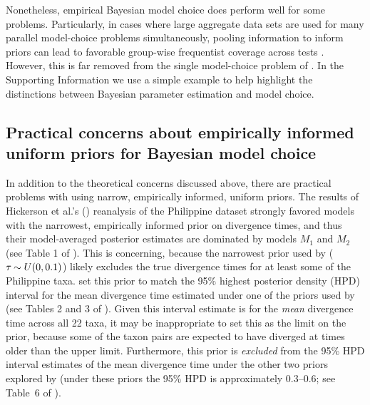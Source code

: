Nonetheless, empirical Bayesian model choice does perform well for some
problems.
Particularly, in cases where large aggregate data sets are used for many
parallel model-choice problems simultaneously, pooling information to inform
priors can lead to favorable group-wise frequentist coverage across tests
\citep{Efron2008}.
However, this is far removed from the single model-choice problem of \msb.
In the Supporting Information we use a simple example to help highlight the
distinctions between Bayesian parameter estimation and model choice.

\subsection{Practical concerns about empirically informed uniform priors for
    Bayesian model choice}
In addition to the theoretical concerns discussed above, there are practical
problems with using narrow, empirically informed, uniform priors.
The results of Hickerson et al.'s (\citeyear{Hickerson2013}) reanalysis of the
Philippine dataset strongly favored models with the narrowest, empirically
informed prior on divergence times, and thus their model-averaged posterior
estimates are dominated by models $M_1$ and $M_2$ (see Table 1 of
\citet{Hickerson2013}).
This is concerning, because the narrowest \divt{} prior used by
\citet{Hickerson2013} ($\tau_{} \sim U(0,0.1)$) likely excludes the true
divergence times for at least some of the Philippine taxa.
\citet{Hickerson2013} set this prior to match the 95\% highest posterior
density (HPD) interval for the mean divergence time estimated under one of the
priors used by \citet{Oaks2012} (see Tables 2 and 3 of \citet{Oaks2012}).
Given this interval estimate is for the \emph{mean} divergence time across all
22 taxa, it may be inappropriate to set this as the limit on the prior, because
some of the taxon pairs are expected to have diverged at times older than the
upper limit.
Furthermore, this prior is \emph{excluded} from the 95\% HPD interval estimates
of the mean divergence time under the other two priors explored by
\citet{Oaks2012} (under these priors the 95\% HPD is approximately 0.3--0.6;
see Table~6 of \citet{Oaks2012}).

